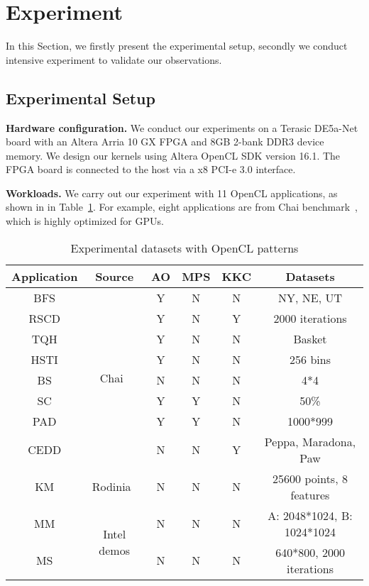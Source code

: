 \section{Experiment}
\label{sec_experiment}
In this Section, we firstly present the experimental setup, secondly we conduct intensive experiment to validate our observations. 

\vspace{-1ex}
\subsection{Experimental Setup}
\label{subsec_experiment_stup}
{\bf Hardware configuration.}
We conduct our experiments on a Terasic DE5a-Net board with an Altera Arria 10 GX FPGA and 8GB 2-bank DDR3 device memory. We design our kernels using Altera OpenCL SDK version 16.1. The FPGA board is connected to the host via a x8 PCI-e 3.0 interface.
	

{\bf Workloads. }We carry out our experiment with 11 OpenCL applications, as shown in in Table~\ref{t_dataset}. 
For example, eight applications are from Chai benchmark~\cite{chang2017collaborative}, which is highly optimized for GPUs.%

\begin{table}%
    \centering
        \begin{scriptsize}
    \begin{tabular}{|c|c|c|c|c|c|}
        \hline
        Application & Source & AO & MPS & KKC & Datasets \\
        \hline
        BFS & \multirow{8}{*}{Chai~\cite{chang2017collaborative}} & Y & N & N & NY, NE, UT \\
        \cline{1-1} \cline{3-6}
        RSCD &  & Y & N & Y & 2000 iterations \\
        \cline{1-1} \cline{3-6}
        TQH &  & Y & N & N & Basket \\
        \cline{1-1} \cline{3-6}
        HSTI &  & Y & N & N & 256 bins \\
        \cline{1-1} \cline{3-6}
        BS &  & N & N & N & 4*4 \\
        \cline{1-1} \cline{3-6}
        SC &  & Y & Y & N & 50\% \\
        \cline{1-1} \cline{3-6}
        PAD &  & Y & Y & N & 1000*999 \\
        \cline{1-1} \cline{3-6}
        CEDD &  & N & N & Y & Peppa, Maradona, Paw \\
        \hline
        KM & Rodinia~\cite{rodinia_iiswc09} & N & N & N & 25600 points, 8 features \\
        \hline
        MM & \multirow{2}{*}{Intel demos} & N & N & N & A: 2048*1024, B: 1024*1024 \\
        \cline{1-1} \cline{3-6}
        MS &  & N & N & N & 640*800, 2000 iterations \\
        \hline
    \end{tabular}
        \end{scriptsize}
    \caption{Experimental datasets with OpenCL patterns}
    \vspace{-5.5ex}
    \label{t_dataset}
\end{table}


